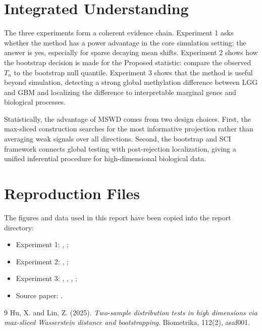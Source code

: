 \documentclass[a4paper,11pt]{article}
\begin{document}
\section{Integrated Understanding}

The three experiments form a coherent evidence chain. Experiment 1 asks whether the method has a power advantage in the core simulation setting; the answer is yes, especially for sparse decaying mean shifts. Experiment 2 shows how the bootstrap decision is made for the Proposed statistic: compare the observed \(T_n\) to the bootstrap null quantile. Experiment 3 shows that the method is useful beyond simulation, detecting a strong global methylation difference between LGG and GBM and localizing the difference to interpretable marginal genes and biological processes.

Statistically, the advantage of MSWD comes from two design choices. First, the max-sliced construction searches for the most informative projection rather than averaging weak signals over all directions. Second, the bootstrap and SCI framework connects global testing with post-rejection localization, giving a unified inferential procedure for high-dimensional biological data.

\section{Reproduction Files}

The figures and data used in this report have been copied into the report directory:

\begin{itemize}
  \item Experiment 1: , ;
  \item Experiment 2: , ;
  \item Experiment 3: , , , ;
  \item Source paper: .
\end{itemize}

\begin{thebibliography}{9}
Hu, X. and Lin, Z. (2025).
\textit{Two-sample distribution tests in high dimensions via max-sliced Wasserstein distance and bootstrapping}.
Biometrika, 112(2), asaf001.
\end{thebibliography}
\end{document}
